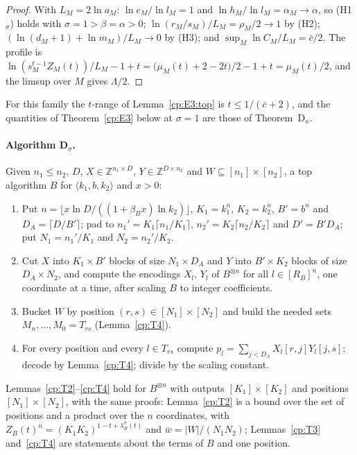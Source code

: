 \documentclass[11pt]{article}
\theoremstyle{definition}
\theoremstyle{remark}
\providecommand{\Z}{\mathbb{Z}}
\newcommand{\abs}[1]{\lvert #1\rvert}
\newcommand{\mat}[3]{\langle #1,#2,#3\rangle} %
\newcommand{\ZB}{Z_B}                         %
\newcommand{\RB}{R_B}                         %
\newcommand{\Lam}{\Lambda}                    %
\newcommand{\cbar}{\bar c}                    %
\newcommand{\Hcond}[1]{\textup{(H#1)}}        %
\newcommand{\Hscond}[1]{\textup{(H#1$_\sigma$)}} %
\newcommand{\ThmDk}{Theorem~D\texorpdfstring{\ensuremath{_\kappa}}{\_kappa}}     %
\begin{document}
\begin{proof}
With $L_M=2\ln a_M$: $\ln e_M/\ln l_M=1$ and $\ln h_M/\ln l_M=\alpha_M\to\alpha$, so \Hscond1{} holds with $\sigma=1>\beta=\alpha>0$; $\ln(r_M/s_M)/L_M=\rho_M/2\to1$ by \Hcond2; $(\ln(d_M+1)+\ln m_M)/L_M\to0$ by \Hcond3; and $\sup_M\ln C_M/L_M=\cbar/2$. The profile is $\ln(s_M^{t-1}Z_M(t))/L_M-1+t=\bigl(\mu_M(t)+2-2t\bigr)/2-1+t=\mu_M(t)/2$, and the limsup over $M$ gives $\Lam/2$.
\end{proof}

For this family the $t$-range of Lemma~\ref{cp:E3:top} is $t\le1/(\cbar+2)$, and the quantities of Theorem~\ref{cp:E3} below at $\sigma=1$ are those of \ThmDk.

\paragraph{Algorithm D$_\sigma$.}
Given $n_1\le n_2$, $D$, $X\in\Z^{n_1\times D}$, $Y\in\Z^{D\times n_2}$ and $W\subseteq[n_1]\times[n_2]$, a top algorithm $B$ for $\mat{k_1}b{k_2}$ and $x>0$:
\begin{enumerate}
\item Put $n=\lfloor x\ln D/((1+\beta_Bx)\ln k_2)\rfloor$, $K_1=k_1^n$, $K_2=k_2^n$, $B'=b^n$ and $D_A=\lceil D/B'\rceil$; pad to $n_1'=K_1\lceil n_1/K_1\rceil$, $n_2'=K_2\lceil n_2/K_2\rceil$ and $D'=B'D_A$; put $N_1=n_1'/K_1$ and $N_2=n_2'/K_2$.
\item Cut $X$ into $K_1\times B'$ blocks of size $N_1\times D_A$ and $Y$ into $B'\times K_2$ blocks of size $D_A\times N_2$, and compute the encodings $X_l$, $Y_l$ of $B^{\otimes n}$ for all $l\in[\RB]^n$, one coordinate at a time, after scaling $B$ to integer coefficients.
\item Bucket $W$ by position $(r,s)\in[N_1]\times[N_2]$ and build the needed sets $M_n,\dots,M_0=T_{rs}$ (Lemma~\ref{cp:T4}).
\item For every position and every $l\in T_{rs}$ compute $p_l=\sum_{j<D_A}X_l[r,j]Y_l[j,s]$; decode by Lemma~\ref{cp:T4}; divide by the scaling constant.
\end{enumerate}
Lemmas~\ref{cp:T2}--\ref{cp:T4} hold for $B^{\otimes n}$ with outputs $[K_1]\times[K_2]$ and positions $[N_1]\times[N_2]$, with the same proofs: Lemma~\ref{cp:T2} is a bound over the set of positions and a product over the $n$ coordinates, with $\ZB(t)^n=(K_1K_2)^{1-t+\lambda^\sigma_B(t)}$ and $\bar w=\abs W/(N_1N_2)$; Lemmas~\ref{cp:T3} and~\ref{cp:T4} are statements about the terms of $B$ and one position.
\end{document}
